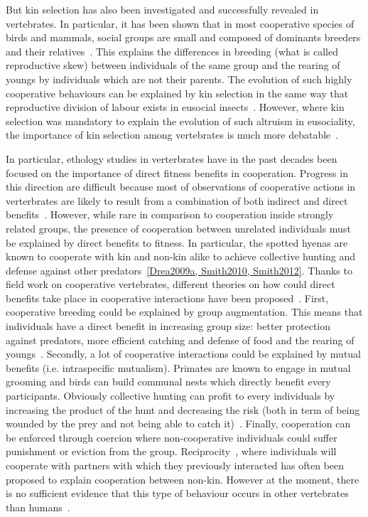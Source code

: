     But kin selection has also been investigated and successfully revealed in vertebrates. In particular, it has been shown that in most cooperative species of birds and mammals, social groups are small and composed of dominants breeders and their relatives~\cite{Dugatkin1997, Clutton-Brock2002}. This explains the differences in breeding (what is called reproductive skew) between individuals of the same group and the rearing of youngs by individuals which are not their parents. The evolution of such highly cooperative behaviours can be explained by kin selection in the same way that reproductive division of labour exists in eusocial insects~\cite{Bourke2011}. However, where kin selection was mandatory to explain the evolution of such altruism in eusociality, the importance of kin selection among vertebrates is much more debatable~\cite{Griffin2003, Clutton-Brock2002}.

    In particular, ethology studies in verterbrates have in the past decades been focused on the importance of direct fitness benefits in cooperation. Progress in this direction are difficult because most of observations of cooperative actions in verterbrates are likely to result from a combination of both indirect and direct benefits~\cite{Clutton-Brock2009}. However, while rare in comparison to cooperation inside strongly related groups, the presence of cooperation between unrelated individuals must be explained by direct benefits to fitness. In particular, the spotted hyenas are known to cooperate with kin and non-kin alike to achieve collective hunting and defense against other predators~\ref{Drea2009a, Smith2010, Smith2012}. Thanks to field work on cooperative vertebrates, different theories on how could direct benefits take place in cooperative interactions have been proposed~\cite{Clutton-Brock2002}. First, cooperative breeding could be explained by group augmentation. This means that individuals have a direct benefit in increasing group size: better protection against predators, more efficient catching and defense of food and the rearing of youngs~\cite{Packer2001}. Secondly, a lot of cooperative interactions could be explained by mutual benefits (i.e. intraspecific mutualism). Primates are known to engage in mutual grooming and birds can build communal nests which directly benefit every participants. Obviously collective hunting can profit to every individuals by increasing the product of the hunt and decreasing the risk (both in term of being wounded by the prey and not being able to catch it)~\cite{Scheel1991}. Finally, cooperation can be enforced through coercion where non-cooperative individuals could suffer punishment or eviction from the group. Reciprocity~\cite{Trivers1971}, where individuals will cooperate with partners with which they previously interacted has often been proposed to explain cooperation between non-kin. However at the moment, there is no sufficient evidence that this type of behaviour occurs in other vertebrates than humans~\cite{Hammerstein2003, Clutton-Brock2009, André2014}.

